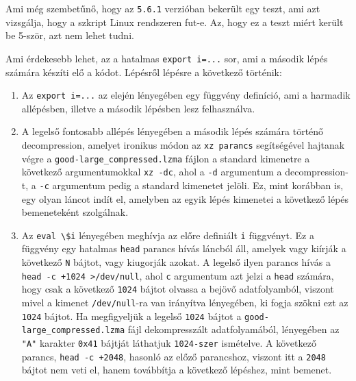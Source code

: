 \documentclass[11pt]{article}
\begin{document}
Ami még szembetűnő, hogy az \lstinline{5.6.1} verzióban bekerült egy teszt, ami azt vizsgálja, hogy a szkript Linux rendszeren fut-e. Az, hogy ez a teszt miért került be 5-ször, azt nem lehet tudni.

Ami érdekesebb lehet, az a hatalmas \lstinline{export i=...} sor, ami a második lépés számára készíti elő a kódot.
Lépésről lépésre a következő történik:
\begin{enumerate}
    \item Az \lstinline{export i=...} az elején lényegében egy függvény definíció, ami a harmadik allépésben, illetve a második lépésben lesz felhasználva.
    
    \item A legelső fontosabb allépés lényegében a második lépés számára történő decompression, amelyet ironikus módon az \lstinline{xz parancs} segítségével hajtanak végre a \lstinline{good-large_compressed.lzma} fájlon a standard kimenetre a következő argumentumokkal \lstinline{xz -dc}, ahol a \lstinline{-d} argumentum a decompression-t, a \lstinline{-c} argumentum pedig a standard kimenetet jelöli. Ez, mint korábban is, egy olyan láncot indít el, amelyben az egyik lépés kimenetei a következő lépés bemeneteként szolgálnak.

    \item Az \lstinline{eval \$i} lényegében meghívja az előre definiált \lstinline{i} függvényt. Ez a függvény egy hatalmas \lstinline{head} parancs hívás láncból áll, amelyek vagy kiírják a következő \lstinline{N} bájtot, vagy kiugorják azokat. 
    A legelső ilyen parancs hívás a \lstinline{head -c +1024 >/dev/null}, ahol \lstinline{c} argumentum azt jelzi a \lstinline{head} számára, hogy csak a következő \lstinline{1024} bájtot olvassa a bejövő adatfolyamból, viszont mivel a kimenet \lstinline{/dev/null}-ra van irányítva lényegében, ki fogja szökni ezt az \lstinline{1024} bájtot.
    Ha megfigyeljük a legelső \lstinline{1024} bájtot a \lstinline{good-large_compressed.lzma} fájl dekompresszált adatfolyamából, lényegében az \lstinline{"A"} karakter \lstinline{0x41} bájtját láthatjuk \lstinline{1024-szer} ismételve.
    A következő parancs, \lstinline{head -c +2048}, hasonló az előző parancshoz, viszont itt a \lstinline{2048} bájtot nem veti el, hanem továbbítja a következő lépéshez, mint bemenet.
    

\end{enumerate}
\end{document}
